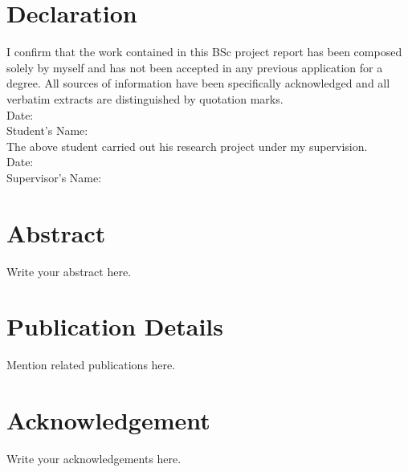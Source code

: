 \documentclass[12pt,a4paper]{report}
\begin{document}
\clearpage
{}

\clearpage
{}
\setcounter{page}{1}
\pagestyle{fancy}

\chapter*{Declaration}
I confirm that the work contained in this BSc project report has been composed solely by myself and has not been accepted in any previous application for a degree. All sources of information have been specifically acknowledged and all verbatim extracts are distinguished by quotation marks.\\[1cm]

\noindent Date: \hrulefill \\[0.5cm]
\noindent Student’s Name: \hrulefill \\[2cm]

\noindent The above student carried out his research project under my supervision.\\[1cm]

\noindent Date: \hrulefill \\[0.5cm]
\noindent Supervisor’s Name: \hrulefill

\clearpage

\clearpage




\chapter*{Abstract}
Write your abstract here.

\chapter*{Publication Details}
Mention related publications here.

\chapter*{Acknowledgement}
Write your acknowledgements here.
\newpage
\tableofcontents
\newpage
\listoffigures
\newpage
\listoftables
\end{document}
